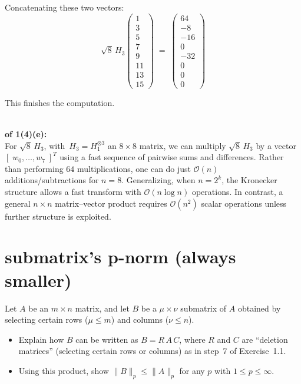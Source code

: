 \documentclass[lang=cn,11pt]{elegantbook}
\begin{document}
\begin{solution}
Concatenating these two vectors:
\[
\sqrt{8}\,H_3
\begin{pmatrix}
1 \\ 3 \\ 5 \\ 7 \\ 9 \\ 11 \\ 13 \\ 15
\end{pmatrix}
\;=\;
\begin{pmatrix}
64 \\ -8 \\ -16 \\ 0 \\[4pt]
-32 \\ 0 \\ 0 \\ 0
\end{pmatrix}
\]

This finishes the computation.\\\\
\end{solution}


\begin{solution}
    \textbf{of 1(4)(e):}\\
For \(\sqrt{8}\,H_3\), with \(\,H_3=H_1^{\otimes 3}\) an \(8\times 8\) matrix, we can multiply
\(\sqrt{8}\,H_3\) by a vector \([\;w_0,\dots,w_7\;]^T\)
using a fast sequence of pairwise sums and differences. Rather than performing \(64\) multiplications, one can do just \(\mathcal{O}(n)\) additions/subtractions for \(n=8\). 
Generalizing, when \(n=2^k\), the Kronecker structure allows a fast transform with \(\mathcal{O}(n\log n)\) operations. In contrast, a general \(n\times n\) matrix--vector product requires \(\mathcal{O}(n^2)\) scalar operations unless further structure is exploited.
\end{solution}

\bigskip

\section{submatrix's p-norm (always smaller)}

Let \(A\) be an \(m\times n\) matrix, and let \(B\) be a \(\mu\times \nu\) submatrix of \(A\) obtained by selecting certain rows (\(\mu\le m\)) and columns (\(\nu\le n\)). 
\begin{itemize}
  \item[(a)] Explain how \(B\) can be written as \(B = R\,A\,C\), where \(R\) and \(C\) are ``deletion matrices'' (selecting certain rows or columns) as in step~7 of Exercise~1.1.
  \item[(b)] Using this product, show \(\|B\|_p \le \|A\|_p\) for any \(p\) with \(1\le p\le\infty\).
\end{itemize}
\end{document}

